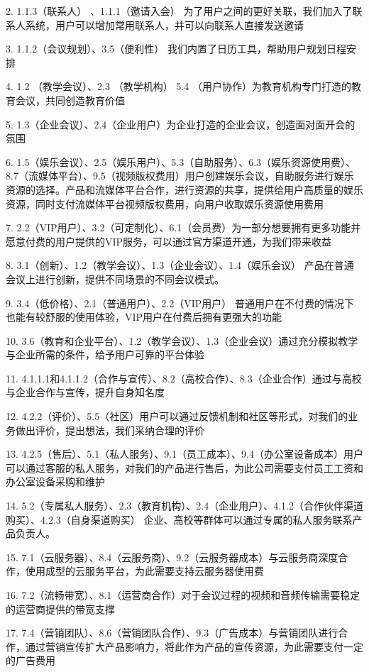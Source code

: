\documentclass[a4paper,12pt]{article}
\begin{document}
2. 1.1.3（联系人） 、1.1.1（邀请入会） 为了用户之间的更好关联，我们加入了联系人系统，用户可以增加常用联系人，并可以向联系人直接发送邀请

3. 1.1.2（会议规划）、3.5（便利性） 我们内置了日历工具，帮助用户规划日程安排

4. 1.2 （教学会议）、2.3 （教学机构） 5.4 （用户协作）为教育机构专门打造的教育会议，共同创造教育价值

5. 1.3（企业会议）、2.4（企业用户）为企业打造的企业会议，创造面对面开会的氛围

6. 1.5（娱乐会议）、2.5（娱乐用户）、5.3（自助服务）、6.3（娱乐资源使用费）、8.7（流媒体平台）、9.5（视频版权费用）用户创建娱乐会议，自助服务进行娱乐资源的选择。产品和流媒体平台合作，进行资源的共享，提供给用户高质量的娱乐资源，同时支付流媒体平台视频版权费用，向用户收取娱乐资源使用费用

7. 2.2（VIP用户）、3.2（可定制化）、6.1（会员费）为一部分想要拥有更多功能并愿意付费的用户提供的VIP服务，可以通过官方渠道开通，为我们带来收益

8. 3.1（创新）、1.2（教学会议）、1.3（企业会议）、1.4（娱乐会议） 产品在普通会议上进行创新，提供不同场景的不同会议模式。

9. 3.4（低价格）、2.1（普通用户）、2.2（VIP用户） 普通用户在不付费的情况下也能有较舒服的使用体验，VIP用户在付费后拥有更强大的功能

10. 3.6（教育和企业平台）、1.2（教学会议）、1.3（企业会议）通过充分模拟教学与企业所需的条件，给予用户可靠的平台体验

11. 4.1.1.1和4.1.1.2（合作与宣传）、8.2（高校合作）、8.3（企业合作）通过与高校与企业合作与宣传，提升自身知名度

12. 4.2.2（评价）、5.5（社区）用户可以通过反馈机制和社区等形式，对我们的业务做出评价，提出想法，我们采纳合理的评价

13. 4.2.5（售后）、5.1（私人服务）、9.1（员工成本）、9.4（办公室设备成本）用户可以通过客服的私人服务，对我们的产品进行售后，为此公司需要支付员工工资和办公室设备采购和维护

14. 5.2（专属私人服务）、2.3（教育机构）、2.4（企业用户）、4.1.2（合作伙伴渠道购买）、4.2.3（自身渠道购买） 企业、高校等群体可以通过专属的私人服务联系产品负责人。

15. 7.1（云服务器）、8.4（云服务商）、9.2（云服务器成本）与云服务商深度合作，使用成型的云服务平台，为此需要支持云服务器使用费

16. 7.2（流畅带宽）、8.1（运营商合作）对于会议过程的视频和音频传输需要稳定的运营商提供的带宽支撑

17. 7.4（营销团队）、8.6（营销团队合作）、9.3（广告成本）与营销团队进行合作，通过营销宣传扩大产品影响力，将此作为产品的宣传资源，为此需要支付一定的广告费用
\end{document}
